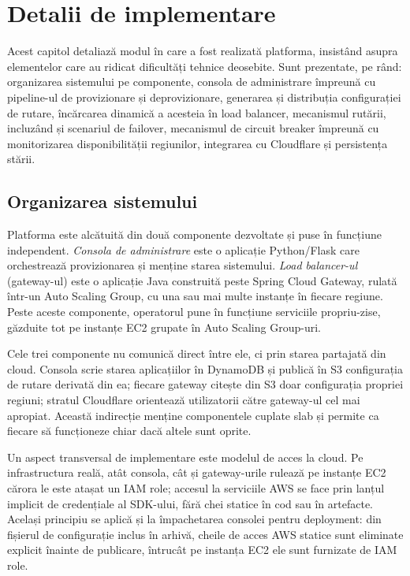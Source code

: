 \documentclass[12pt,a4paper]{report}
\begin{document}
\chapter{Detalii de implementare}

Acest capitol detaliază modul în care a fost realizată platforma, insistând asupra elementelor care au ridicat dificultăți tehnice deosebite. Sunt prezentate, pe rând: organizarea sistemului pe componente, consola de administrare împreună cu pipeline-ul de provizionare și deprovizionare, generarea și distribuția configurației de rutare, încărcarea dinamică a acesteia în load balancer, mecanismul rutării, incluzând și scenariul de failover, mecanismul de circuit breaker împreună cu monitorizarea disponibilității regiunilor, integrarea cu Cloudflare și persistența stării.

\section{Organizarea sistemului}
Platforma este alcătuită din două componente dezvoltate și puse în funcțiune independent. \emph{Consola de administrare} este o aplicație Python/Flask care orchestrează provizionarea și menține starea sistemului. \emph{Load balancer-ul} (gateway-ul) este o aplicație Java construită peste Spring Cloud Gateway, rulată într-un Auto Scaling Group, cu una sau mai multe instanțe în fiecare regiune. Peste aceste componente, operatorul pune în funcțiune serviciile propriu-zise, găzduite tot pe instanțe EC2 grupate în Auto Scaling Group-uri.

Cele trei componente nu comunică direct între ele, ci prin starea partajată din cloud. Consola scrie starea aplicațiilor în DynamoDB și publică în S3 configurația de rutare derivată din ea; fiecare gateway citește din S3 doar configurația propriei regiuni; stratul Cloudflare orientează utilizatorii către gateway-ul cel mai apropiat. Această indirecție menține componentele cuplate slab și permite ca fiecare să funcționeze chiar dacă altele sunt oprite.

Un aspect transversal de implementare este modelul de acces la cloud. Pe infrastructura reală, atât consola, cât și gateway-urile rulează pe instanțe EC2 cărora le este atașat un IAM role; accesul la serviciile AWS se face prin lanțul implicit de credențiale al SDK-ului, fără chei statice în cod sau în artefacte. Același principiu se aplică și la împachetarea consolei pentru deployment: din fișierul de configurație inclus în arhivă, cheile de acces AWS statice sunt eliminate explicit înainte de publicare, întrucât pe instanța EC2 ele sunt furnizate de IAM role.
\end{document}
